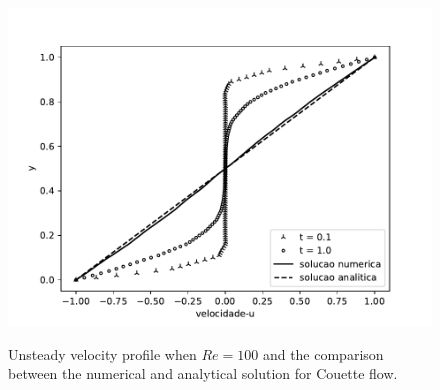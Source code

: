 \begin{figure}[H]
     \centering
     \includegraphics[scale=1]{./02_chaps/cap_validation/figure/couette_velocity.pdf}\\
     \medskip
     \caption{Unsteady velocity profile when $Re=100$ and
     the comparison between the numerical and analytical solution 
     for Couette flow.}
     \label{velocidade couette}
\end{figure}

